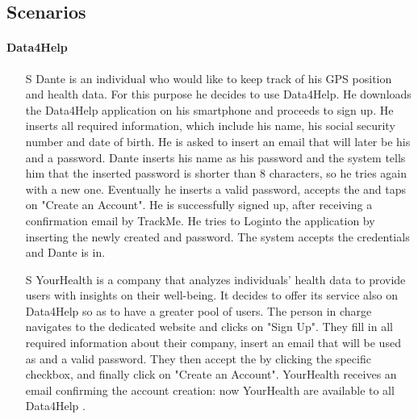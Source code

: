 \documentclass[../../../rasd.tex]{subfiles}
\begin{document}
\subsection{Scenarios}
        \paragraph{Data4Help}
        \begin{itemize}

                    \item[S\subs{1}] Dante is an individual who would like to keep track of his GPS position and health data. For this purpose he decides to use Data4Help. He downloads the Data4Help application on his smartphone and proceeds to sign up. He inserts all required information, which include his name, his social security number and date of birth. He is asked to insert an email that will later be his  and a password. Dante inserts his name as his password and the system tells him that the inserted password is shorter than 8 characters, so he tries again with a new one. Eventually he inserts a valid password, accepts the  and taps on "Create an Account". He is successfully signed up, after receiving a confirmation email by TrackMe. He tries to Loginto the application by inserting the newly created  and password. The system accepts the credentials and Dante is in.
                    
                    \item[S\subs{2}] YourHealth is a company that analyzes individuals' health data to provide users with insights on their well-being. It decides to offer its service also on Data4Help so as to have a greater pool of users. The person in charge navigates to the  dedicated website and clicks on "Sign Up". They fill in all required information about their company, insert an email that will be used as  and a valid password. They then accept the  by clicking the specific checkbox, and finally click on "Create an Account". YourHealth receives an email confirming the account creation: now YourHealth  are available to all Data4Help .
                    

\end{itemize}
\end{document}
